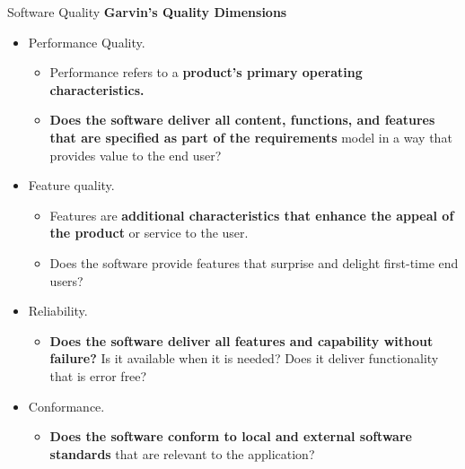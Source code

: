 \documentclass{beamer}
\begin{document}
\begin{frame}{Software Quality}
	\textbf{Garvin’s Quality Dimensions }
	\begin{itemize}
		\item Performance Quality. 
		\begin{itemize}
			\item Performance refers to a \textbf{product’s primary operating characteristics.}
			\item \textbf{Does the software deliver all content, functions, and features that are specified as part of the requirements }model in a way that provides value to the end user?
		\end{itemize} 
	\item Feature quality. 
	\begin{itemize}
		\item Features are \textbf{additional characteristics that enhance the appeal of the product} or service to the user.
		\item Does the software provide features that surprise and delight first-time end users?
	\end{itemize}
\item Reliability. 
\begin{itemize}
	\item \textbf{Does the software deliver all features and capability without failure?} Is it available when it is needed? Does it deliver functionality that is error free?
\end{itemize}
\item Conformance. 
\begin{itemize}
	\item\textbf{ Does the software conform to local and external software standards} that are relevant to the application?
\end{itemize}
	\end{itemize}
\end{frame}
\end{document}

